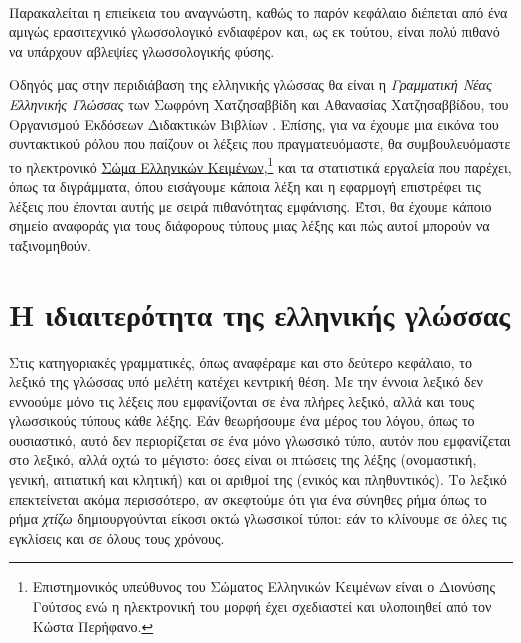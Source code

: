 \documentclass [a4paper,11pt] {book}
\theoremstyle{definition}
\theoremstyle{definition}
\newenvironment{note}[1][Σημείωση]{\begin{trivlist}
\item[\hskip \labelsep {\bfseries #1}]}{\end{trivlist}}
\begin{document}
\paragraph{}
Παρακαλείται η επιείκεια του αναγνώστη, καθώς το παρόν κεφάλαιο διέπεται από ένα αμιγώς ερασιτεχνικό γλωσσολογικό ενδιαφέρον και, ως εκ τούτου, είναι πολύ πιθανό να υπάρχουν αβλεψίες γλωσσολογικής φύσης.
\begin{note}
Οδηγός μας στην περιδιάβαση της ελληνικής γλώσσας θα είναι η \textit{Γραμματική Νέας Ελληνικής Γλώσσας} των Σωφρόνη Χατζησαββίδη και Αθανασίας Χατζησαββίδου, του Οργανισμού Εκδόσεων Διδακτικών Βιβλίων \citep{grammatiki}. Επίσης, για να έχουμε μια εικόνα του συντακτικού ρόλου που παίζουν οι λέξεις που πραγματευόμαστε, θα συμβουλευόμαστε το ηλεκτρονικό \href{http://www.sek.edu.gr}{Σώμα Ελληνικών Κειμένων},\footnote{Επιστημονικός υπεύθυνος του Σώματος Ελληνικών Κειμένων είναι ο Διονύσης Γούτσος \citep{goutsos} ενώ η ηλεκτρονική του μορφή έχει σχεδιαστεί και υλοποιηθεί από τον Κώστα Περήφανο.} και τα στατιστικά εργαλεία που παρέχει, όπως τα διγράμματα, όπου εισάγουμε κάποια λέξη και η εφαρμογή επιστρέφει τις λέξεις που έπονται αυτής με σειρά πιθανότητας εμφάνισης. Έτσι, θα έχουμε κάποιο σημείο αναφοράς για τους διάφορους τύπους μιας λέξης και πώς αυτοί μπορούν να ταξινομηθούν.
\end{note}
\section{Η ιδιαιτερότητα της ελληνικής γλώσσας}
Στις κατηγοριακές γραμματικές, όπως αναφέραμε και στο δεύτερο κεφάλαιο, το λεξικό της γλώσσας υπό μελέτη κατέχει κεντρική θέση. Με την έννοια λεξικό δεν εννοούμε μόνο τις λέξεις που εμφανίζονται σε ένα πλήρες λεξικό, αλλά και τους γλωσσικούς τύπους κάθε λέξης. Εάν θεωρήσουμε ένα μέρος του λόγου, όπως το ουσιαστικό, αυτό δεν περιορίζεται σε ένα μόνο γλωσσικό τύπο, αυτόν που εμφανίζεται στο λεξικό, αλλά οχτώ το μέγιστο: όσες είναι οι πτώσεις της λέξης (ονομαστική, γενική, αιτιατική και κλητική) και οι αριθμοί της (ενικός και πληθυντικός). Το λεξικό επεκτείνεται ακόμα περισσότερο, αν σκεφτούμε ότι για ένα σύνηθες ρήμα όπως το ρήμα \textit{χτίζω} δημιουργούνται είκοσι οκτώ γλωσσικοί τύποι: εάν το κλίνουμε σε όλες τις εγκλίσεις και σε όλους τους χρόνους.
\end{document}

